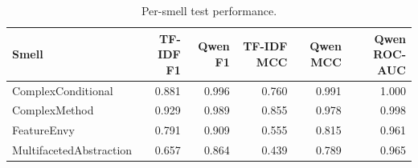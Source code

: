 \begin{table}[H]
\centering
\small
\begin{tabular}{@{}lrrrrr@{}}
\toprule
Smell & TF-IDF F1 & Qwen F1 & TF-IDF MCC & Qwen MCC & Qwen ROC-AUC \\
\midrule
ComplexConditional & 0.881 & 0.996 & 0.760 & 0.991 & 1.000 \\
ComplexMethod & 0.929 & 0.989 & 0.855 & 0.978 & 0.998 \\
FeatureEnvy & 0.791 & 0.909 & 0.555 & 0.815 & 0.961 \\
MultifacetedAbstraction & 0.657 & 0.864 & 0.439 & 0.789 & 0.965 \\
\bottomrule
\end{tabular}
\caption{Per-smell test performance.}
\label{tab:per-smell-metrics}
\end{table}
